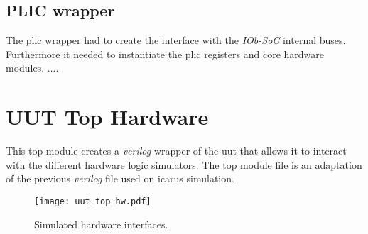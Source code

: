 \subsection{PLIC wrapper}
The \acrshort{plic} wrapper had to create the interface with the \textit{IOb-SoC} internal buses. Furthermore it needed to instantiate the \acrshort{plic} registers and core hardware modules. 
....

\section{UUT Top Hardware}
This top module creates a \textit{verilog} wrapper of the \acrfull{uut} that allows it to interact with the different hardware logic simulators. The top module file is an adaptation of the previous \textit{verilog} file used on icarus simulation.

\begin{figure}[!ht]
    \centering
    \texttt{[image: uut\_top\_hw.pdf]}
    \caption{Simulated hardware interfaces.}
    \label{fig:uut_top_hw}
\end{figure}
